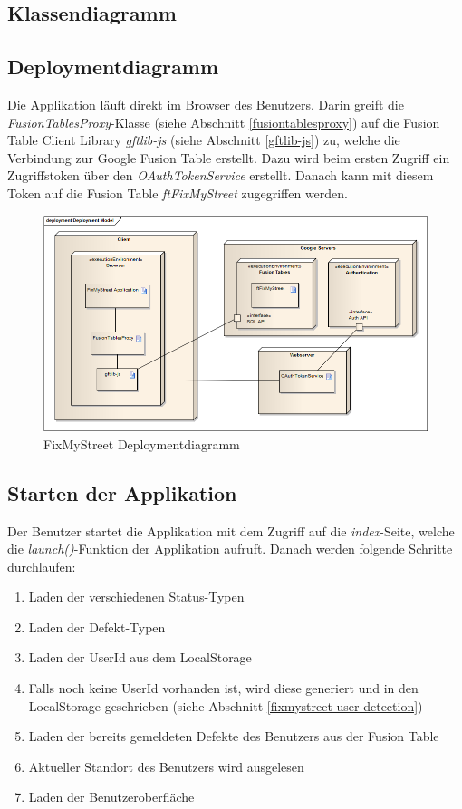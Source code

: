 \subsection{Klassendiagramm}

\subsection{Deploymentdiagramm}
Die Applikation läuft direkt im Browser des Benutzers. Darin greift die \emph{FusionTablesProxy}-Klasse (siehe Abschnitt \ref{fusiontablesproxy}) auf die Fusion Table Client Library \emph{gftlib-js} (siehe Abschnitt \ref{gftlib-js}) zu, welche die Verbindung zur Google Fusion Table erstellt. Dazu wird beim ersten Zugriff ein Zugriffstoken über den \emph{OAuthTokenService} erstellt. Danach kann mit diesem Token auf die Fusion Table \emph{ftFixMyStreet} zugegriffen werden.

\begin{figure}[H]
	\centering
	\includegraphics[scale=0.5]{images/usecase2-fixmystreet/uml/fixmystreet-deploymentmodel.png}
	\caption{FixMyStreet Deploymentdiagramm}
	\label{fixmystreet-deploymentmodel}
\end{figure}

\subsection{Starten der Applikation}
Der Benutzer startet die Applikation mit dem Zugriff auf die \emph{index}-Seite, welche die \emph{launch()}-Funktion der Applikation aufruft. Danach werden folgende Schritte durchlaufen:

\begin{enumerate}
\item Laden der verschiedenen Status-Typen
\item Laden der Defekt-Typen
\item Laden der UserId aus dem LocalStorage
\item Falls noch keine UserId vorhanden ist, wird diese generiert und in den LocalStorage geschrieben (siehe Abschnitt \ref{fixmystreet-user-detection})
\item Laden der bereits gemeldeten Defekte des Benutzers aus der Fusion Table
\item Aktueller Standort des Benutzers wird ausgelesen
\item Laden der Benutzeroberfläche
\end{enumerate}

